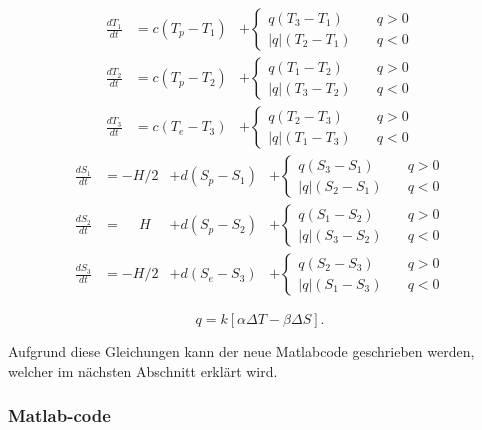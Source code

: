 \begin{equation}
\begin{aligned}
\frac{dT_1}{dt} &= c(T_p-T_1)&+ \begin{cases} q(T_3-T_1) & \quad q>0 \\ |q|(T_2-T_1) & \quad q<0 \end{cases}
\\
\frac{dT_2}{dt} &= c(T_p-T_2)&+\begin{cases} q(T_1-T_2) & \quad q>0 \\ |q|(T_3-T_2) & \quad q<0 \end{cases}
\\
\frac{dT_3}{dt} &= c(T_e-T_3)&+\begin{cases} q(T_2-T_3) & \quad q>0 \\ |q|(T_1-T_3) & \quad q<0 \end{cases}
\end{aligned}
\end{equation}
\begin{equation}
\begin{aligned}
\frac{dS_1}{dt} &= -H/2 &+ d(S_p-S_1)&+\begin{cases} q(S_3-S_1) & \quad q>0 \\ |q|(S_2-S_1) & \quad q<0 \end{cases}
\\
\frac{dS_2}{dt} &= \phantom{-}H &+ d(S_p-S_2)&+\begin{cases} q(S_1-S_2) & \quad q>0 \\ |q|(S_3-S_2) & \quad q<0 \end{cases}	
\\
\frac{dS_3}{dt} &= -H/2 &+d(S_e-S_3)&+\begin{cases} q(S_2-S_3) & \quad q>0 \\ |q|(S_1-S_3) & \quad q<0 \end{cases}
\end{aligned}
\end{equation}

\begin{equation}
q = k[\alpha\Delta T-\beta\Delta S].
\end{equation}



Aufgrund diese Gleichungen kann der neue Matlabcode geschrieben werden, welcher im nächsten Abschnitt erklärt wird.


\subsubsection{Matlab-code}

